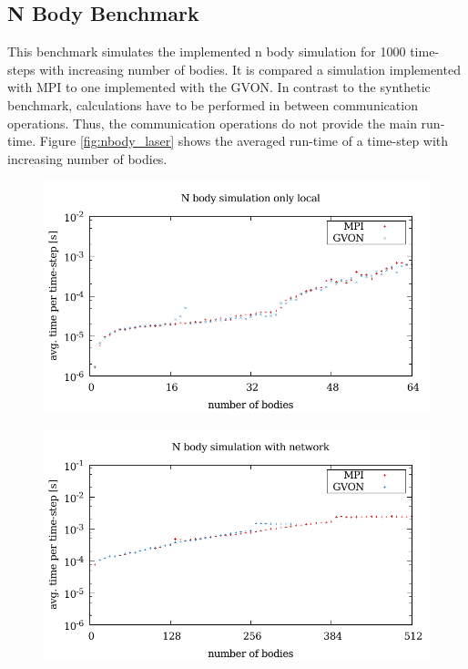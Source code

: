 \subsection{N Body Benchmark}
This benchmark simulates the implemented n body simulation for 1000
time-steps with increasing number of bodies. It is compared a
simulation implemented with MPI to one implemented with the GVON. In
contrast to the synthetic benchmark, calculations have to be performed
in between communication operations. Thus, the communication operations
do not provide the main run-time. Figure \ref{fig:nbody_laser} shows
the averaged run-time of a time-step with increasing number of bodies.

\begin{figure}[H]
  \begin{minipage}[t]{0.5\textwidth}
   \includegraphics[width=\textwidth]{plots/50_nbody_laser}
  \label{fig:nbody_laser}
  \caption{ }
  \end{minipage}%
  \begin{minipage}[t]{0.5\textwidth}
    \includegraphics[width=\textwidth]{plots/50_nbody_network_laser}
    \label{fig:nbody_network_laser}
    \caption{ }
  \end{minipage}%
\end{figure}

